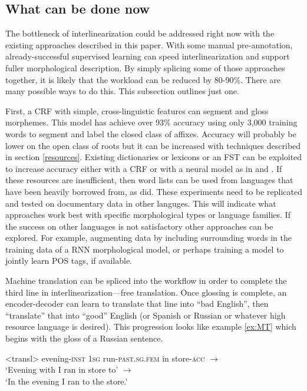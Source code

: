 \documentclass[12pt]{article}
\begin{document}
\subsection{What can be done now}
\label{sec:splicing}
The bottleneck of interlinearization could be addressed right now with the existing approaches described in this paper. With some manual pre-annotation, already-successful supervised learning can speed interlinearization and support fuller morphological description. By simply splicing some of those approaches together, it is likely that the workload can be reduced by 80-90\%. There are many possible ways to do this. This subsection outlines just one.

First, a CRF with simple, cross-linguistic features can segment and gloss morphemes. This model has achieve over 93\% accuracy using only 3,000 training words to segment and label the closed class of affixes\cite{moeller_automatic_2018}. Accuracy will probably be lower on the open class of roots but it can be increased with  techniques described in section \ref{resources}. Existing dictionaries or lexicons or an FST can be exploited to increase accuracy either with a CRF or with a neural model as in and . If these resources are insufficient, then word lists can be used from languages that have been heavily borrowed from, as  did. These experiments need to be replicated and tested on documentary data in other languges. This will indicate what approaches work best with specific morphological types or language families. If the success on other languages is not satisfactory other approaches can be explored. For example, augmenting data by including surrounding words in the training data of a RNN morphological model, or perhaps  training a model to jointly learn POS tags, if available. 

Machine translation can be spliced into the workflow in order to complete the third line in interlinearization---free translation. Once glossing is complete, an encoder-decoder can learn to translate that line into ``bad English'', then ``translate'' that into ``good'' English (or Spanish or Russian or whatever high resource language is desired). This progression looks like example \ref{ex:MT} which begins with the gloss of a Russian sentence.

\begin{singlespace}
\pex<transl> 
\label{ex:MT}
evening\textsc{-inst} \textsc{1sg} run\textsc{-past.sg.fem} in store\textsc{-acc} $\longrightarrow$ \\
`Evening with I ran in store to' $\longrightarrow$ \\
`In the evening I ran to the store.'
\xe
\end{singlespace}
\end{document}
